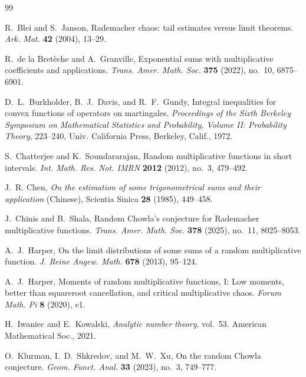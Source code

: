 \documentclass[12pt]{amsart}
\numberwithin{equation}{section}
\theoremstyle{plain}
\theoremstyle{definition}
\begin{document}
	\begin{thebibliography}{99}
		
		
		
		R.~Blei and S.~Janson,
		Rademacher chaos: tail estimates versus limit theorems.
		\emph{Ark. Mat.} \textbf{42} (2004), 13--29.
		
		R.~de la Bret{\`e}che and A.~Granville,
		Exponential sums with multiplicative coefficients and applications.
		\emph{Trans. Amer. Math. Soc.} \textbf{375} (2022), no.~10, 6875--6901.
		
		D.~L.~Burkholder, B.~J.~Davis, and R.~F.~Gundy,
		Integral inequalities for convex functions of operators on martingales.
		\emph{Proceedings of the Sixth Berkeley Symposium on Mathematical Statistics and Probability, Volume II: Probability Theory}, 223--240, Univ. California Press, Berkeley, Calif., 1972.
		
		S.~Chatterjee and K.~Soundararajan,
		Random multiplicative functions in short intervals.
		\emph{Int. Math. Res. Not. IMRN} \textbf{2012} (2012), no.~3, 479--492.
		
		J.~R. Chen, \emph{On the estimation of some trigonometrical sums and their application} (Chinese), Scientia Sinica \textbf{28} (1985), 449--458.
		
		J.~Chinis and B.~Shala,
		Random Chowla's conjecture for Rademacher multiplicative functions.
		\emph{Trans. Amer. Math. Soc.} \textbf{378} (2025), no.~11, 8025--8053.
		
		A.~J.~Harper,
		On the limit distributions of some sums of a random multiplicative function.
		\emph{J. Reine Angew. Math.} \textbf{678} (2013), 95--124.
		
		A.~J.~Harper,
		Moments of random multiplicative functions, I: Low moments, better than squareroot cancellation, and critical multiplicative chaos.
		\emph{Forum Math. Pi} \textbf{8} (2020), e1.
		
		H.~Iwaniec and E.~Kowalski, \textit{Analytic number theory}, vol.~53. American Mathematical Soc., 2021.
		
		O.~Klurman, I.~D.~Shkredov, and M.~W.~Xu,
		On the random Chowla conjecture.
		\emph{Geom. Funct. Anal.} \textbf{33} (2023), no.~3, 749--777.
		

\end{thebibliography}
\end{document}
